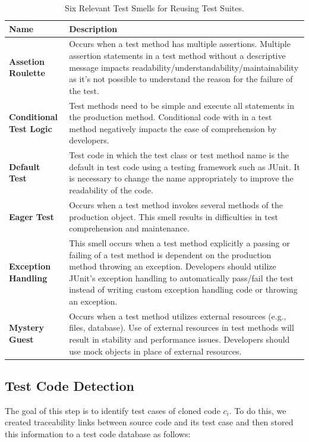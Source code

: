 \documentclass[conference]{IEEEtran}
\begin{document}
\begin{table}[t]
\caption{Six Relevant Test Smells for Reusing Test Suites.}
\label{smells}
\begin{tabular}{|l|p{14.5cm}|}
\hline
\textbf{Name}                   & \textbf{Description}                                                                                                       \\ \hline
\textbf{Assetion Roulette}        & Occurs when a test method has multiple assertions. Multiple assertion statements in a test method without a descriptive message impacts readability/understandability/maintainability as it’s not possible to understand the reason for the failure of the test.  \\ \hline
\textbf{Conditional Test Logic} & Test methods need to be simple and execute all statements in the production method. Conditional code with in a test method negatively impacts the ease of comprehension by developers.\\ \hline
\textbf{Default Test}            & Test code in which the test class or test method name is the default in test code using a testing framework such as JUnit. It is necessary to change the name appropriately to improve the readability of the code.                                                                                                      \\ \hline
\textbf{Eager Test }             & Occurs when a test method invokes several methods of the production object. This smell results in difficulties in test comprehension and maintenance. \\ \hline
\textbf{Exception Handling}      & This smell occurs when a test method explicitly a passing or failing of a test method is dependent on the production method throwing an exception. Developers should utilize JUnit's exception handling to automatically pass/fail the test instead of writing custom exception handling code or throwing an exception. \\ \hline
\textbf{Mystery Guest}          & Occurs when a test method utilizes external resources (e.g., files, database). Use of external resources in test methods will result in stability and performance issues. Developers should use mock objects in place of external resources. \\ \hline
\end{tabular}
\end{table}

\subsection{Test Code Detection}
The goal of this step is to identify test cases of cloned code $c_i$. To do this, we created traceability links between source code and its test case and then stored this information to a test code database as follows:
\end{document}
